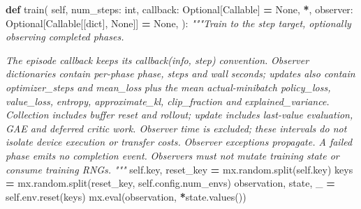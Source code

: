 \documentclass[
  chinese,
  11pt,
  letterpaper,
]{article}
\newenvironment{Shaded}{\begin{snugshade}}{\end{snugshade}}
\newcommand{\BuiltInTok}[1]{#1}
\newcommand{\CommentTok}[1]{\textcolor[rgb]{0.56,0.35,0.01}{\textit{#1}}}
\newcommand{\KeywordTok}[1]{\textcolor[rgb]{0.13,0.29,0.53}{\textbf{#1}}}
\newcommand{\NormalTok}[1]{#1}
\newcommand{\OperatorTok}[1]{\textcolor[rgb]{0.81,0.36,0.00}{\textbf{#1}}}
\newcommand{\VariableTok}[1]{\textcolor[rgb]{0.00,0.00,0.00}{#1}}
\renewenvironment{Shaded}{\par\smallskip}{\par\smallskip}
\begin{document}
\begin{Shaded}
\begin{Highlighting}[]
    \KeywordTok{def}\NormalTok{ train(}
        \VariableTok{self}\NormalTok{,}
\NormalTok{        num\_steps: }\BuiltInTok{int}\NormalTok{,}
\NormalTok{        callback: Optional[Callable] }\OperatorTok{=} \VariableTok{None}\NormalTok{,}
        \OperatorTok{*}\NormalTok{,}
\NormalTok{        observer: Optional[Callable[[}\BuiltInTok{dict}\NormalTok{], }\VariableTok{None}\NormalTok{]] }\OperatorTok{=} \VariableTok{None}\NormalTok{,}
\NormalTok{    ):}
        \CommentTok{"""Train to the step target, optionally observing completed phases.}

\CommentTok{        The episode callback keeps its \textasciigrave{}\textasciigrave{}callback(info, step)\textasciigrave{}\textasciigrave{} convention.}
\CommentTok{        Observer dictionaries contain per{-}phase \textasciigrave{}\textasciigrave{}phase\textasciigrave{}\textasciigrave{}, \textasciigrave{}\textasciigrave{}steps\textasciigrave{}\textasciigrave{} and wall}
\CommentTok{        \textasciigrave{}\textasciigrave{}seconds\textasciigrave{}\textasciigrave{}; updates also contain \textasciigrave{}\textasciigrave{}optimizer\_steps\textasciigrave{}\textasciigrave{} and \textasciigrave{}\textasciigrave{}mean\_loss\textasciigrave{}\textasciigrave{}}
\CommentTok{        plus the mean actual{-}minibatch \textasciigrave{}\textasciigrave{}policy\_loss\textasciigrave{}\textasciigrave{}, \textasciigrave{}\textasciigrave{}value\_loss\textasciigrave{}\textasciigrave{},}
\CommentTok{        \textasciigrave{}\textasciigrave{}entropy\textasciigrave{}\textasciigrave{}, \textasciigrave{}\textasciigrave{}approximate\_kl\textasciigrave{}\textasciigrave{}, \textasciigrave{}\textasciigrave{}clip\_fraction\textasciigrave{}\textasciigrave{} and}
\CommentTok{        \textasciigrave{}\textasciigrave{}explained\_variance\textasciigrave{}\textasciigrave{}.}
\CommentTok{        Collection includes buffer reset and rollout; update includes last{-}value}
\CommentTok{        evaluation, GAE and deferred critic work. Observer time is excluded;}
\CommentTok{        these intervals do not isolate device execution or transfer costs.}
\CommentTok{        Observer exceptions propagate. A failed phase emits no completion event.}
\CommentTok{        Observers must not mutate training state or consume training RNGs.}
\CommentTok{        """}
        \VariableTok{self}\NormalTok{.key, reset\_key }\OperatorTok{=}\NormalTok{ mx.random.split(}\VariableTok{self}\NormalTok{.key)}
\NormalTok{        keys }\OperatorTok{=}\NormalTok{ mx.random.split(reset\_key, }\VariableTok{self}\NormalTok{.config.num\_envs)}
\NormalTok{        observation, state, \_ }\OperatorTok{=} \VariableTok{self}\NormalTok{.env.reset(keys)}
\NormalTok{        mx.}\BuiltInTok{eval}\NormalTok{(observation, }\OperatorTok{*}\NormalTok{state.values())}


\end{Highlighting}
\end{Shaded}
\end{document}
